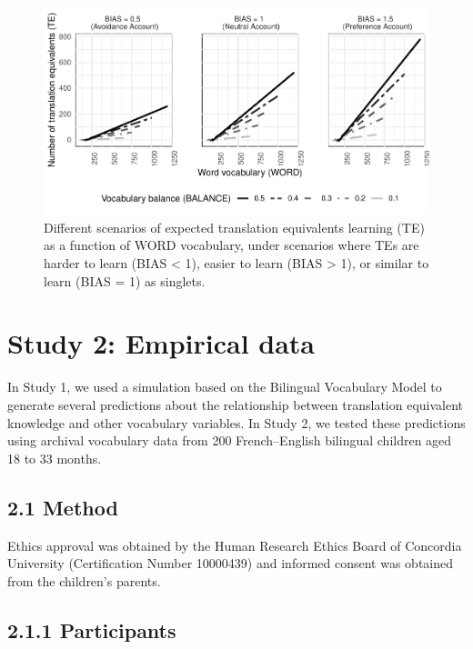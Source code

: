 \documentclass[
  english,
  ,man,floatsintext]{apa6}
\begin{document}
\begin{figure}[H]

{\centering \includegraphics[width=1\linewidth,height=0.8\textheight]{paper_TE_bilingual_vocabulary_model_files/figure-latex/fig4-1} 

}

\caption{Different scenarios of expected translation equivalents learning (TE) as a function of WORD vocabulary, under scenarios where TEs are harder to learn (BIAS < 1), easier to learn (BIAS > 1), or similar to learn (BIAS = 1) as singlets.}\label{fig:fig4}
\end{figure}

\hypertarget{study-2-empirical-data}{%
\section{Study 2: Empirical data}\label{study-2-empirical-data}}

In Study 1, we used a simulation based on the Bilingual Vocabulary Model to generate several predictions about the relationship between translation equivalent knowledge and other vocabulary variables. In Study 2, we tested these predictions using archival vocabulary data from 200 French--English bilingual children aged 18 to 33 months.

\hypertarget{method}{%
\subsection{2.1 Method}\label{method}}

Ethics approval was obtained by the Human Research Ethics Board of Concordia University (Certification Number 10000439) and informed consent was obtained from the children's parents.

\hypertarget{participants}{%
\subsection{2.1.1 Participants}\label{participants}}
\end{document}
